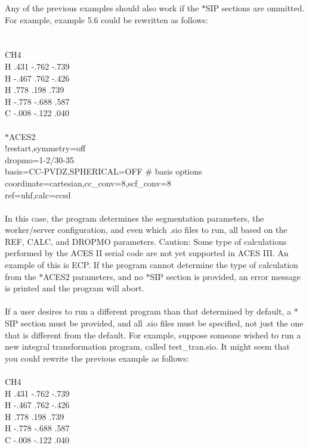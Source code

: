 \documentclass[12pt]{article}
\begin{document}
\noindent 
Any of the previous examples should also work if the $*$SIP sections are ommitted. 
For example, example 5.6 could be rewritten as follows:\\ 
\\
\\
CH4\\
H    .431     -.762     -.739\\ 
H   -.467      .762     -.426\\ 
H    .778      .198      .739\\ 
H   -.778     -.688      .587\\ 
C   -.008     -.122      .040\\ 
\\
$*$ACES2\\ 
!restart,symmetry=off\\ 
dropmo=1-2/30-35\\ 
basis=CC-PVDZ,SPHERICAL=OFF \# basis options\\ 
coordinate=cartesian,cc\_conv=8,scf\_conv=8\\ 
ref=uhf,calc=ccsd\\ 
\\
In this case, the program determines the segmentation parameters, the worker/server 
configuration, and even which .sio files to run, all based on the REF, CALC, and DROPMO 
parameters. Caution: Some type of calculations performed by the ACES II serial code are not 
yet supported in ACES III. An example of this is ECP. If the program cannot determine the 
type of calculation from the $*$ACES2 parameters, and no $*$SIP section is provided, an 
error message is printed and the program will abort.\\ 
\\
If a user desires to run a different program than that determined by default, a $*$SIP 
section must be provided, and all .sio files must be specified, not just the one that is 
different from the default. For example, suppose someone wished to run a new integral 
transformation program, called test\_tran.sio. It might seem that you could rewrite the 
previous example as follows:\\ 
\\ 
CH4\\ 
H    .431     -.762     -.739\\ 
H   -.467      .762     -.426\\ 
H    .778      .198      .739\\ 
H   -.778     -.688      .587\\
C   -.008     -.122      .040\\
\end{document}
